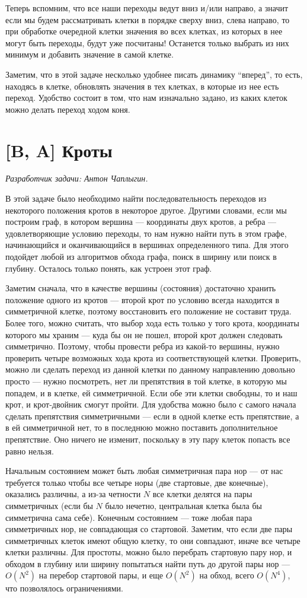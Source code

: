 \documentclass[12pt]{article}
\theoremstyle{definition}
\begin{document}
Теперь вспомним, что все наши переходы ведут вниз и/или направо, а значит если мы будем рассматривать клетки в порядке
сверху вниз, слева направо, то при обработке очередной клетки
значения во всех клетках, из которых в нее могут быть переходы, будут уже посчитаны! Останется только выбрать из них минимум и добавить значение в самой клетке.

Заметим, что в этой задаче несколько удобнее писать динамику ``вперед'', то есть, находясь в клетке, обновлять значения
в тех клетках, в которые из нее есть переход. Удобство состоит
в том, что нам изначально задано, из каких
клеток можно делать переход ходом коня.

\section{[B, A] Кроты}
\textit{Разработчик задачи: Антон Чаплыгин.}

В этой задаче было необходимо найти последовательность переходов из некоторого положения
кротов в некоторое другое. Другими словами, если мы построим граф, в котором вершина ---
координаты двух кротов, а ребра --- удовлетворяющие условию переходы, то нам нужно найти путь
в этом графе, начинающийся и оканчивающийся в вершинах определенного типа. Для этого
подойдет любой из алгоритмов обхода графа, поиск в ширину или поиск в глубину. Осталось
только понять, как устроен этот граф.

Заметим сначала, что в качестве вершины (состояния) достаточно хранить положение одного из кротов --- второй крот по условию всегда находится в симметричной клетке, поэтому восстановить
его положение не составит труда. Более того, можно считать, что выбор хода есть только у
того крота, координаты которого мы храним --- куда бы он не пошел, второй крот должен следовать симметрично. Поэтому,
чтобы провести ребра из какой-то вершины, нужно проверить четыре возможных хода крота
из соответствующей клетки. Проверить, можно ли сделать переход из данной клетки по
данному направлению довольно просто --- нужно посмотреть, нет ли препятствия в той клетке,
в которую мы попадем, и в клетке, ей симметричной. Если обе эти клетки свободны, то и наш
крот, и крот-двойник смогут пройти. Для удобства можно было с самого начала сделать
препятствия симметричными --- если в одной клетке есть препятствие, а в ей
симметричной нет, то в последнюю можно поставить дополнительное препятствие. Оно
ничего не изменит, поскольку в эту пару клеток попасть все равно нельзя.

Начальным состоянием может быть любая симметричная пара нор --- от нас требуется
только чтобы все четыре норы (две стартовые, две конечные), оказались различны, а из-за
четности $N$ все клетки делятся на пары симметричных (если бы $N$ было нечетно,
центральная клетка была бы симметрична сама себе). Конечным состоянием --- тоже любая пара симметричных нор, не совпадающая со стартовой. Заметим, что если две пары симметричных клеток
имеют общую клетку, то они совпадают, иначе все четыре клетки различны. Для простоты,
можно было перебрать стартовую пару нор, и обходом в глубину или ширину попытаться
найти путь до другой пары нор --- $O(N^2)$ на перебор стартовой пары, и еще
$O(N^2)$ на обход, всего $O(N^4)$, что позволялось ограничениями.
\end{document}
